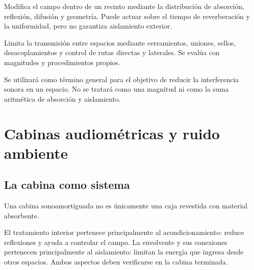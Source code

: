 \begin{description}[style=nextline]
    \item[Acondicionamiento acústico.]
    Modifica el campo dentro de un recinto mediante la distribución de
    absorción, reflexión, difusión y geometría. Puede actuar sobre el tiempo de
    reverberación y la uniformidad, pero no garantiza aislamiento exterior.

    \item[Aislamiento acústico.]
    Limita la transmisión entre espacios mediante cerramientos, uniones,
    sellos, desacoplamientos y control de rutas directas y laterales. Se evalúa
    con magnitudes y procedimientos propios.

    \item[Insonorización.]
    Se utilizará como término general para el objetivo de reducir la
    interferencia sonora en un espacio. No se tratará como una magnitud ni como
    la suma aritmética de absorción y aislamiento.
\end{description}


\section{Cabinas audiométricas y ruido ambiente}
\label{sec:u9-cabinas}

\subsection{La cabina como sistema}
\label{sec:u9-cabina-sistema}

Una cabina sonoamortiguada no es únicamente una caja revestida con material
absorbente. 

El tratamiento interior pertenece principalmente al acondicionamiento: reduce
reflexiones y ayuda a controlar el campo. La envolvente y sus conexiones
pertenecen principalmente al aislamiento: limitan la energía que ingresa desde
otros espacios. Ambos aspectos deben verificarse en la cabina terminada.

